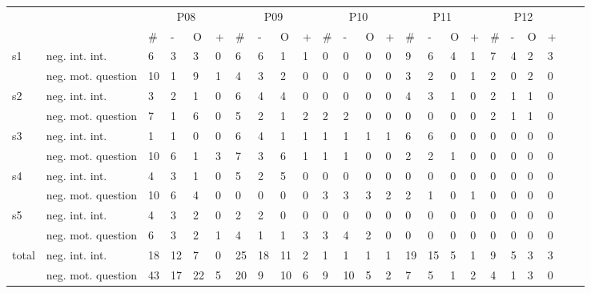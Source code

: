 \begin{screenonly}
\begin{table*}[h]
\begin{small}
\begin{tabular*}{\hsize}{@{\extracolsep{\fill}}llllllllllllllllllllllll}
      \toprule
      &  & \multicolumn{4}{c}{P08} & \multicolumn{4}{c}{P09} & \multicolumn{4}{c}{P10} & \multicolumn{4}{c}{P11} & \multicolumn{4}{c}{P12}\\
      \cmidrule(lr){3-6}\cmidrule(lr){7-10}\cmidrule(lr){11-14}\cmidrule(lr){15-18}\cmidrule(lr){19-22}
      &  & \# & - & O & + & \# & - & O & + & \# & - & O & + & \# & - & O & + & \# & - & O & + &\\
      \cmidrule(lr){3-6}\cmidrule(lr){7-10}\cmidrule(lr){11-14}\cmidrule(lr){15-18}\cmidrule(lr){19-22}
      \multirow{2}{*}{s1} & neg. int. int. & 6 & 3 & 3 & 0 & 6 & 6 & 1 & 1 & 0 & 0 & 0 & 0 & 9 & 6 & 4 & 1 & 7 & 4 & 2 & 3\\
      & neg. mot. question & 10 & 1 & 9 & 1 & 4 & 3 & 2 & 0 & 0 & 0 & 0 & 0 & 3 & 2 & 0 & 1 & 2 & 0 & 2 & 0\\
      \multirow{2}{*}{s2} & neg. int. int. & 3 & 2 & 1 & 0 & 6 & 4 & 4 & 0 & 0 & 0 & 0 & 0 & 4 & 3 & 1 & 0 & 2 & 1 & 1 & 0\\
      & neg. mot. question & 7 & 1 & 6 & 0 & 5 & 2 & 1 & 2 & 2 & 2 & 0 & 0 & 0 & 0 & 0 & 0 & 2 & 1 & 1 & 0\\
      \multirow{2}{*}{s3} & neg. int. int. & 1 & 1 & 0 & 0 & 6 & 4 & 1 & 1 & 1 & 1 & 1 & 1 & 6 & 6 & 0 & 0 & 0 & 0 & 0 & 0\\
      & neg. mot. question & 10 & 6 & 1 & 3 & 7 & 3 & 6 & 1 & 1 & 1 & 0 & 0 & 2 & 2 & 1 & 0 & 0 & 0 & 0 & 0\\
      \multirow{2}{*}{s4} & neg. int. int. & 4 & 3 & 1 & 0 & 5 & 2 & 5 & 0 & 0 & 0 & 0 & 0 & 0 & 0 & 0 & 0 & 0 & 0 & 0 & 0\\
      & neg. mot. question & 10 & 6 & 4 & 0 & 0 & 0 & 0 & 0 & 3 & 3 & 3 & 2 & 2 & 1 & 0 & 1 & 0 & 0 & 0 & 0\\
      \multirow{2}{*}{s5} & neg. int. int. & 4 & 3 & 2 & 0 & 2 & 2 & 0 & 0 & 0 & 0 & 0 & 0 & 0 & 0 & 0 & 0 & 0 & 0 & 0 & 0\\
      & neg. mot. question & 6 & 3 & 2 & 1 & 4 & 1 & 1 & 3 & 3 & 4 & 2 & 0 & 0 & 0 & 0 & 0 & 0 & 0 & 0 & 0\\
      \multirow{2}{*}{total} & neg. int. int. & 18 & 12 & 7 & 0 & 25 & 18 & 11 & 2 & 1 & 1 & 1 & 1 & 19 & 15 & 5 & 1 & 9 & 5 & 3 & 3\\
      & neg. mot. question & 43 & 17 & 22 & 5 & 20 & 9 & 10 & 6 & 9 & 10 & 5 & 2 & 7 & 5 & 1 & 2 & 4 & 1 & 3 & 0\\
      \bottomrule
    \end{tabular*}
  \end{small}
\end{table*}


\end{screenonly}


\clearpage



